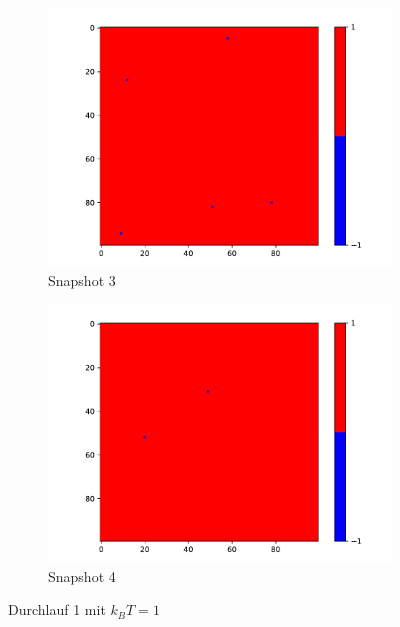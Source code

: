 \begin{figure}
    \begin{subfigure}{0.45\textwidth}
      \centering
      \includegraphics[width=\linewidth]{images/Ising1_3.pdf}
      \caption{Snapshot 3}
      \label{fig:image3}
    \end{subfigure}
    \hfill
    \begin{subfigure}{0.45\textwidth}
      \centering
      \includegraphics[width=\linewidth]{images/Ising1_4.pdf}
      \caption{Snapshot 4}
      \label{fig:image4}
    \end{subfigure}
    \caption{Durchlauf 1 mit $k_BT = 1$}
    \label{fig:two_by_two}
  \end{figure}

